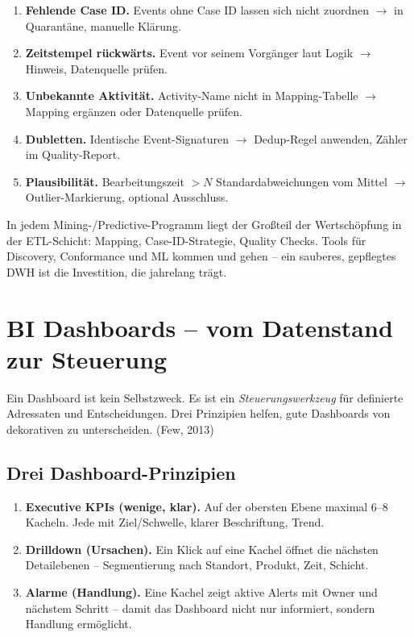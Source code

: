 \documentclass[11pt,a4paper,oneside]{article}
\newcommand{\fachbegriff}[1]{\textbf{#1}}
\newcommand{\quelle}[1]{{\footnotesize\color{lpGray}(#1)}}
\begin{document}
\begin{enumerate}
  \item \fachbegriff{Fehlende Case ID.} Events ohne Case ID lassen sich nicht zuordnen $\rightarrow$ in Quarantäne, manuelle Klärung.
  \item \fachbegriff{Zeitstempel rückwärts.} Event vor seinem Vorgänger laut Logik $\rightarrow$ Hinweis, Datenquelle prüfen.
  \item \fachbegriff{Unbekannte Aktivität.} Activity-Name nicht in Mapping-Tabelle $\rightarrow$ Mapping ergänzen oder Datenquelle prüfen.
  \item \fachbegriff{Dubletten.} Identische Event-Signaturen $\rightarrow$ Dedup-Regel anwenden, Zähler im Quality-Report.
  \item \fachbegriff{Plausibilität.} Bearbeitungs\-zeit $> N$ Standardabweichungen vom Mittel $\rightarrow$ Outlier-Markierung, optional Ausschluss.
\end{enumerate}

\begin{merkbox}
In jedem Mining-/Predictive-Programm liegt der Großteil der Wert\-schöpfung in der ETL-Schicht: Mapping, Case-ID-Strategie, Quality Checks. Tools für Discovery, Conformance und ML kommen und gehen -- ein sauberes, gepflegtes DWH ist die Investition, die jahrelang trägt.
\end{merkbox}

\section{BI Dashboards -- vom Datenstand zur Steuerung}

Ein Dashboard ist kein Selbstzweck. Es ist ein \emph{Steuerungswerkzeug} für definierte Adressaten und Entscheidungen. Drei Prinzipien helfen, gute Dashboards von dekorativen zu unterscheiden. \quelle{Few, 2013}

\subsection{Drei Dashboard-Prinzipien}

\begin{enumerate}
  \item \fachbegriff{Executive KPIs (wenige, klar).} Auf der obersten Ebene maximal 6--8 Kacheln. Jede mit Ziel/Schwelle, klarer Beschriftung, Trend.
  \item \fachbegriff{Drilldown (Ursachen).} Ein Klick auf eine Kachel öffnet die nächsten Detailebenen -- Segmentierung nach Standort, Produkt, Zeit, Schicht.
  \item \fachbegriff{Alarme (Handlung).} Eine Kachel zeigt aktive Alerts mit Owner und nächstem Schritt -- damit das Dashboard nicht nur informiert, sondern Handlung ermöglicht.
\end{enumerate}
\end{document}
